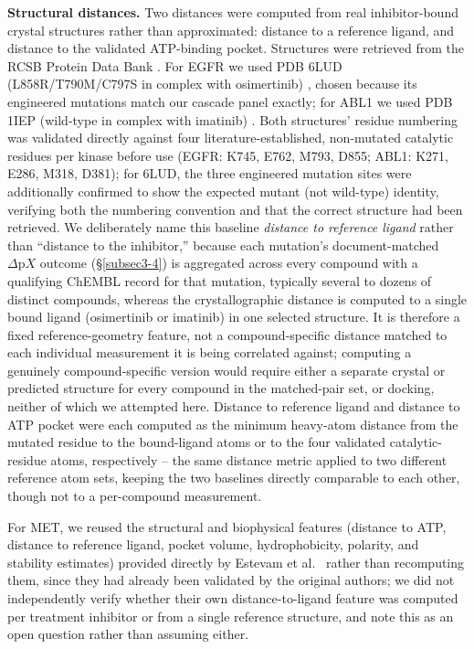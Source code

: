 \documentclass[pdflatex,sn-mathphys-num]{sn-jnl}%
\theoremstyle{thmstyleone}%
\theoremstyle{thmstyletwo}%
\theoremstyle{thmstylethree}%
\begin{document}
\textbf{Structural distances.} Two distances were computed from real inhibitor-bound crystal structures rather than approximated: distance to a reference ligand, and distance to the validated ATP-binding pocket. Structures were retrieved from the RCSB Protein Data Bank \citep{Burley2021}. For EGFR we used PDB 6LUD (L858R/T790M/C797S in complex with osimertinib) \citep{Kashima2020}, chosen because its engineered mutations match our cascade panel exactly; for ABL1 we used PDB 1IEP (wild-type in complex with imatinib) \citep{Nagar2002}. Both structures' residue numbering was validated directly against four literature-established, non-mutated catalytic residues per kinase before use (EGFR: K745, E762, M793, D855; ABL1: K271, E286, M318, D381); for 6LUD, the three engineered mutation sites were additionally confirmed to show the expected mutant (not wild-type) identity, verifying both the numbering convention and that the correct structure had been retrieved. We deliberately name this baseline \emph{distance to reference ligand} rather than ``distance to the inhibitor,'' because each mutation's document-matched $\Delta\mathrm{p}X$ outcome (\S\ref{subsec3-4}) is aggregated across every compound with a qualifying ChEMBL record for that mutation, typically several to dozens of distinct compounds, whereas the crystallographic distance is computed to a single bound ligand (osimertinib or imatinib) in one selected structure. It is therefore a fixed reference-geometry feature, not a compound-specific distance matched to each individual measurement it is being correlated against; computing a genuinely compound-specific version would require either a separate crystal or predicted structure for every compound in the matched-pair set, or docking, neither of which we attempted here. Distance to reference ligand and distance to ATP pocket were each computed as the minimum heavy-atom distance from the mutated residue to the bound-ligand atoms or to the four validated catalytic-residue atoms, respectively -- the same distance metric applied to two different reference atom sets, keeping the two baselines directly comparable to each other, though not to a per-compound measurement.

For MET, we reused the structural and biophysical features (distance to ATP, distance to reference ligand, pocket volume, hydrophobicity, polarity, and stability estimates) provided directly by Estevam et al.\ \citep{Estevam2025} rather than recomputing them, since they had already been validated by the original authors; we did not independently verify whether their own distance-to-ligand feature was computed per treatment inhibitor or from a single reference structure, and note this as an open question rather than assuming either.
\end{document}
